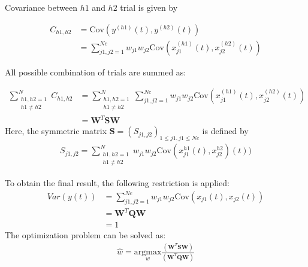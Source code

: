 Covariance between $h1$ and $h2$ trial is given by


 


\begin{equation}\label{eq2}
\begin{split}
C_{h1,h2}&=\text{Cov}(y^{(h1)}(t),y^{(h2)}(t))\\
&=\sum_{j1,j2=1}^{Nc} w_{j1}w_{j2}\text{Cov}(x_{j1}^{(h1)}(t), x_{j2}^{(h2)}(t))
\end{split}
\end{equation}

All possible combination of trials are summed as:

\begin{equation}\label{eq3}
\begin{split}
\sum_{\substack{h1,h2=1 \\ h1\neq h2}}^{N} C_{h1,h2} &= \sum_{\substack{h1,h2=1 \\ h1\neq h2}}^{N}\sum_{j1,j2=1}^{Nc} w_{j1}w_{j2}\text{Cov}(x_{j1}^{(h1)}(t), x_{j2}^{(h2)}(t)) \\
&=\mathbf{W}^{T}\mathbf{S}\mathbf{W}
\end{split}
\end{equation}
Here, the symmetric matrix $\mathbf{S} = (S_{j1,j2})_{1\leqslant j1,j1 \leq Nc }$  is defined by
\begin{equation}\label{eq4}
\begin{split}
S_{j1,j2} = \sum_{\substack{h1,h2=1 \\ h1\neq h2}}^{N}w_{j1}w_{j2}\text{Cov}(x_{j1}^{h1}(t),x_{j2}^{h2})(t))
\end{split}
\end{equation}

To obtain the final result, the following restriction is applied:
\begin{equation}\label{eq5}
\begin{split}
Var(y(t)) &= \sum_{j1,j2=1}^{Nc}w_{j1}w_{j2}\text{Cov}(x_{j1}(t),x_{j2}(t))\\
&=\mathbf{W}^T\mathbf{Q}\mathbf{W}\\
&=1
\end{split}
\end{equation}
The optimization problem can be solved as:
\begin{equation}\label{eq6}
\begin{split}
\hat{w} = \underset{w}{\text{argmax}}\frac{(\mathbf{W}^T\mathbf{S}\mathbf{W})}{(\mathbf{W}^T\mathbf{Q}\mathbf{W})}
\end{split}
\end{equation}

